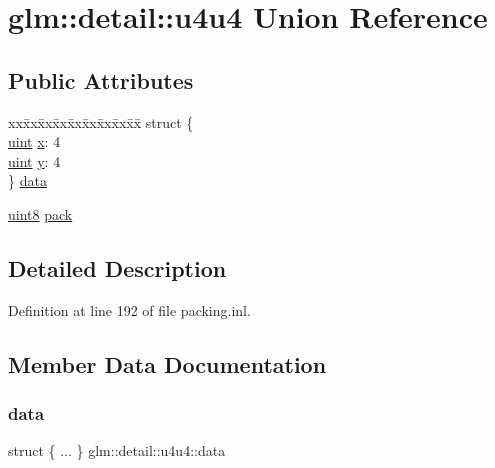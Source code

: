 \hypertarget{unionglm_1_1detail_1_1u4u4}{}\section{glm\+::detail\+::u4u4 Union Reference}
\label{unionglm_1_1detail_1_1u4u4}
\subsection*{Public Attributes}
\begin{DoxyCompactItemize}
\item 
\begin{tabbing}
xx\=xx\=xx\=xx\=xx\=xx\=xx\=xx\=xx\=\kill
struct \{\\
\>\mbox{\hyperlink{group__core__precision_ga4fd29415871152bfb5abd588334147c8}{uint}} \mbox{\hyperlink{unionglm_1_1detail_1_1u4u4_a488b94e524db2319dd7801ef632ef7f1}{x}}: 4\\
\>\mbox{\hyperlink{group__core__precision_ga4fd29415871152bfb5abd588334147c8}{uint}} \mbox{\hyperlink{unionglm_1_1detail_1_1u4u4_a397ae8c3903b0fd4fe9c88617607f7af}{y}}: 4\\
\} \mbox{\hyperlink{unionglm_1_1detail_1_1u4u4_a48ec3d00452dbe6118fb2f5de7860b48}{data}}\\

\end{tabbing}\item 
\mbox{\hyperlink{namespaceglm_1_1detail_aef2588f97d090cc19fbbe0c74fe17c8f}{uint8}} \mbox{\hyperlink{unionglm_1_1detail_1_1u4u4_a823a2e3d7ae6e4710c0ceb40e191ef7b}{pack}}
\end{DoxyCompactItemize}


\subsection{Detailed Description}


Definition at line 192 of file packing.\+inl.



\subsection{Member Data Documentation}
\mbox{\label{unionglm_1_1detail_1_1u4u4_a48ec3d00452dbe6118fb2f5de7860b48}} 
\subsubsection{\texorpdfstring{data}{data}}
{\footnotesize\ttfamily struct \{ ... \}   glm\+::detail\+::u4u4\+::data}

